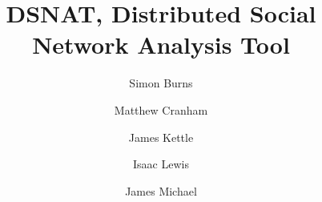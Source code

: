 \begin{titlepage}
\title{DSNAT, Distributed Social Network Analysis Tool}
\author{Simon Burns \and Matthew Cranham \and James Kettle \and Isaac Lewis 		\and James Michael}
\end{titlepage}  